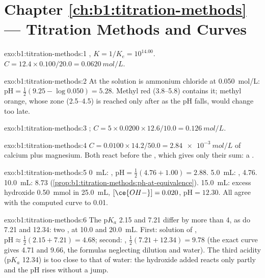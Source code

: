 \section*{Chapter \ref{ch:b1:titration-methods} --- Titration Methods and Curves}

\begin{solution}{exo:b1:titration-methods:1}
, $K = 1/K_e = 10^{14.00}$. $C = 12.4 \times
0.100/20.0 = \qty{0.0620}{mol/L}$.
\end{solution}

\begin{solution}{exo:b1:titration-methods:2}
At  the solution is ammonium chloride at
\qty{0.050}{mol/L}: $\mathrm{pH} = \frac12(9.25 - \log 0.050) = 5.28$.
Methyl red (3.8--5.8) contains it; methyl orange, whose zone (2.5--4.5) is reached only after  as the pH falls, would change too late.
\end{solution}

\begin{solution}{exo:b1:titration-methods:3}
;
$C = 5 \times 0.0200 \times 12.6/10.0 = \qty{0.126}{mol/L}$.
\end{solution}

\begin{solution}{exo:b1:titration-methods:4}
$C = 0.0100 \times 14.2/50.0 = \qty{2.84e-3}{mol/L}$ of calcium plus
magnesium. Both react before the , which gives only their sum:
a .
\end{solution}

\begin{solution}{exo:b1:titration-methods:5}
0~mL: , $\mathrm{pH} = \frac12(4.76 + 1.00) = 2.88$. 5.0~mL:
, 4.76. 10.0~mL: 8.73
(\cref{prop:b1:titration-methods:ph-at-equivalence}). 15.0~mL: excess
hydroxide \qty{0.50}{mmol} in \qty{25.0}{mL}, $[\ce{OH-}] = 0.020$,
$\mathrm{pH} = 12.30$. All agree with the computed curve to 0.01.
\end{solution}

\begin{solution}{exo:b1:titration-methods:6}
The $\mathrm{p}K_a$ 2.15 and 7.21 differ by more than 4, as do 7.21 and
12.34: two , at 10.0 and \qty{20.0}{mL}. First: solution of
, $\mathrm{pH} \approx \frac12(2.15 + 7.21) = 4.68$; second:
, $\frac12(7.21 + 12.34) = 9.78$ (the exact curve gives 4.71 and
9.66, the formulas neglecting dilution and water). The third acidity
($\mathrm{p}K_a$ 12.34) is too close to that of water: the hydroxide added
reacts only partly and the pH rises without a jump.
\end{solution}

